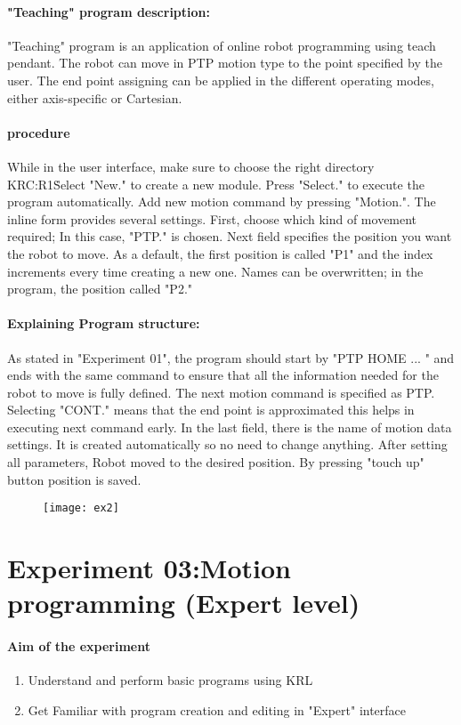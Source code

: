 \documentclass[]{book}
\begin{document}
\paragraph{"Teaching" program description:} 
"Teaching" program is an application of online robot programming using teach pendant. The robot can move in PTP motion type to the point specified by the user. The end point assigning can be applied in the different operating modes, either axis-specific or Cartesian.
\paragraph{procedure}
While in the user interface, make sure to choose the right directory KRC:R1\.Select "New." to create a new module. 
Press "Select." to execute the program automatically.
Add new motion command by pressing "Motion.". The inline form provides several settings. First, choose which kind of movement required; In this case, "PTP." is chosen. 
Next field specifies the position you want the robot to move. As a default, the first position is called "P1" and the index increments every time creating a new one. Names can be overwritten; in the program, the position called "P2."
\newpage
\paragraph{Explaining Program structure:}
As stated in "Experiment 01", the program should start by "PTP HOME  ... " and ends with the same command to ensure that all the information needed for the robot to move is fully defined. 
The next motion command is specified as PTP. Selecting "CONT." means that the end point is approximated this helps in executing next command early. In the last field, there is the name of motion data settings. It is created automatically so no need to change anything.
After setting all parameters, Robot moved to the desired position. By pressing "touch up" button position is saved.

\begin{figure}[H]
	\centering
	\texttt{[image: ex2]}
\end{figure}
\newpage
\section{Experiment 03:Motion programming (Expert level)}
\paragraph{Aim of the experiment}
\begin{enumerate}
	\item Understand and perform basic programs using KRL
	\item Get Familiar with program creation and editing in "Expert" interface
\end{enumerate}
\end{document}

